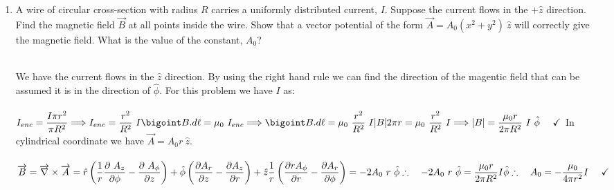 \documentclass[fleqn]{article}
\begin{document}
\begin{enumerate}
    \item A wire of circular cross-section with radius $R$ carries a uniformly distributed current, $I$. Suppose the current flows in the $+\hat{z}$ direction.
    Find the magnetic field $\overrightarrow{B}$ at all points inside the wire. Show that a vector potential of the form 
    $\overrightarrow{A}=A_0 \left(x^2+y^2\right) ~ \hat{z}$ will correctly give the
    magnetic field. What is the value of the constant, $A_0$?

      \textcolor{hwColor}{
        \\
        We have the current flows in the $\hat{z}$ direction. By using the right hand rule we can find the direction of the magentic field 
        that can be assumed it is in the direction of $\hat{\phi}$. For this problem we have $I$ as: 
        \\
        \\
        $
          I_{enc}=\dfrac{I \pi r^2}{\pi R^2} \Longrightarrow I_{enc}=\dfrac{r^2}{R^2} ~ I
          \\
          \\
          \\
          \bigoint B.d\ell=\mu_0 ~ I_{enc} \Longrightarrow \bigoint B.d\ell=\mu_0 ~ \dfrac{r^2}{R^2} ~ I
          \\
          \\
          \\
          |B| 2 \pi r=\mu_0 ~ \dfrac{r^2}{R^2} ~ I \Longrightarrow |B|=\dfrac{\mu_0 r}{2 \pi R^2} ~ I ~ \hat{\phi} ~~~~ \checkmark
          \\
          \\
          \\
        $
        In cylindrical coordinate we have $\overrightarrow{A}=A_0 r ~ \hat{z}$.
        \\
        \\
        $
          \overrightarrow{B}= \overrightarrow{\nabla} \times \overrightarrow{A}
          =\hat{r} \left(\dfrac{1}{r} \dfrac{\partial ~ A_z}{\partial \phi}-\dfrac{\partial ~ A_{\phi}}{\partial z} \right)
          +\hat{\phi} \left(\dfrac{\partial A_r}{\partial z}-\dfrac{\partial A_z}{\partial r}\right)
          +\hat{z} \dfrac{1}{r} \left(\dfrac{\partial r A_{\phi}}{\partial r}-\dfrac{\partial A_r}{\partial \phi}\right)
          =-2A_0 ~ r ~ \hat{\phi}
          \\
          \\
          \\
          \therefore ~~~ -2A_0 ~ r ~ \hat{\phi}=\dfrac{\mu_0 r}{2 \pi R^2} I \hat{\phi}
          \\
          \\
          \\
          \therefore ~~~ A_0=-\dfrac{\mu_0}{4 \pi r^2}I ~~~~ \checkmark
        $
        \\
        \\
      }
    
  \end{enumerate}
\end{document}
